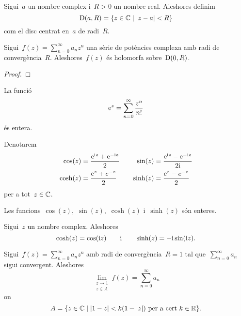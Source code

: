 \documentclass[../Apunts.tex]{subfiles}
\begin{document}
	\begin{definition}[Disc]
		\label{def:disc}
		Sigui~\(a\) un nombre complex i~\(R>0\) un nombre real. Aleshores definim
		\[\Disc(a,R)=\{z\in\CC\mid\modul{z-a}<R\}\]
		com el disc centrat en~\(a\) de radi~\(R\).
	\end{definition}
	\begin{proposition}
		Sigui~\(f(z)=\sum_{n=0}^{\infty}a_{n}z^{n}\) una sèrie de potències complexa amb radi de convergència~\(R\). Aleshores~\(f(z)\) és holomorfa sobre~\(\operatorname{D}(0,R)\).
	\end{proposition}
	\begin{proof}
	\end{proof}
	\begin{example}
		\label{ex:exponencial complexa}
		La funció
		\[\mathrm{e}^{z}=\sum_{n=0}^{\infty}\frac{z^{n}}{n!}\]
		és entera.
	\end{example}
	\begin{notation}
		Denotarem
		\begin{gather*}
			\begin{split}
				\cos(z)&=\frac{\mathrm{e}^{\mathrm{i} z}+\mathrm{e}^{-\mathrm{i} z}}{2} \\
				\cosh(z)&=\frac{\mathrm{e}^{z}+e^{-z}}{2}
			\end{split}\qquad
			\begin{split}
				\sin(z)&=\frac{\mathrm{e}^{\mathrm{i} z}-\mathrm{e}^{-\mathrm{i} z}}{2\mathrm{i}} \\
				\sinh(z)&=\frac{\mathrm{e}^{z}-e^{-z}}{2}
			\end{split} \\
		\end{gather*}
		per a tot~\(z\in\mathbb{C}\).
	\end{notation}
	\begin{observation}
		Les funcions~\(\cos(z)\),~\(\sin(z)\),~\(\cosh(z)\) i~\(\sinh(z)\) són enteres.
	\end{observation}
	\begin{observation}
		Sigui~\(z\) un nombre complex. Aleshores
		\begin{equation*}
			\cosh(z)=\cos(\mathrm{i} z)\qquad\text{i}\qquad\sinh(z)=-\mathrm{i}\sin(\mathrm{i} z).
		\end{equation*}
	\end{observation}
	\begin{theorem}
		\label{thm:Teorema d'Abel per sèries de potències complexes}
		Sigui~\(f(z)=\sum_{n=0}^{\infty}a_{n}z^{n}\) amb radi de convergència~\(R=1\) tal que~\(\sum_{n=0}^{\infty}a_{n}\) sigui convergent. Aleshores
		\[\lim_{\substack{z\to1\\z\in A}}f(z)=\sum_{n=0}^{\infty}a_{n}\]
		on
		\begin{equation}
			\label{eq:1:thm:Teorema d'Abel per sèries de potències complexes}
			A=\{z\in\CC\mid\abs{1-z}<k(1-\modul{z})\text{ per a cert }k\in\RR\}.
		\end{equation}
	\end{theorem}
\end{document}
